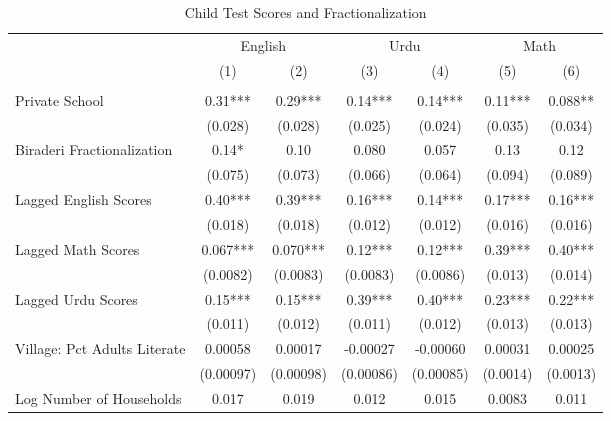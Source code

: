 \begin{sidewaystable}[htbp]\centering
\def\sym#1{\ifmmode^{#1}\else\(^{#1}\)\fi}
\caption{Child Test Scores and Fractionalization \label{kidsnointeract}}
\begin{tabular}{l*{6}{c}}
\toprule
                &\multicolumn{2}{c}{English}&\multicolumn{2}{c}{Urdu} &\multicolumn{2}{c}{Math} \\\cmidrule(lr){2-3}\cmidrule(lr){4-5}\cmidrule(lr){6-7}
                &\multicolumn{1}{c}{(1)}&\multicolumn{1}{c}{(2)}&\multicolumn{1}{c}{(3)}&\multicolumn{1}{c}{(4)}&\multicolumn{1}{c}{(5)}&\multicolumn{1}{c}{(6)}\\
                &\multicolumn{1}{c}{}&\multicolumn{1}{c}{}&\multicolumn{1}{c}{}&\multicolumn{1}{c}{}&\multicolumn{1}{c}{}&\multicolumn{1}{c}{}\\
\midrule
Private School  &     0.31***&     0.29***&     0.14***&     0.14***&     0.11***&    0.088** \\
                &  (0.028)   &  (0.028)   &  (0.025)   &  (0.024)   &  (0.035)   &  (0.034)   \\
Biraderi Fractionalization&     0.14*  &     0.10   &    0.080   &    0.057   &     0.13   &     0.12   \\
                &  (0.075)   &  (0.073)   &  (0.066)   &  (0.064)   &  (0.094)   &  (0.089)   \\
Lagged English Scores&     0.40***&     0.39***&     0.16***&     0.14***&     0.17***&     0.16***\\
                &  (0.018)   &  (0.018)   &  (0.012)   &  (0.012)   &  (0.016)   &  (0.016)   \\
Lagged Math Scores&    0.067***&    0.070***&     0.12***&     0.12***&     0.39***&     0.40***\\
                & (0.0082)   & (0.0083)   & (0.0083)   & (0.0086)   &  (0.013)   &  (0.014)   \\
Lagged Urdu Scores&     0.15***&     0.15***&     0.39***&     0.40***&     0.23***&     0.22***\\
                &  (0.011)   &  (0.012)   &  (0.011)   &  (0.012)   &  (0.013)   &  (0.013)   \\
Village: Pct Adults Literate&  0.00058   &  0.00017   & -0.00027   & -0.00060   &  0.00031   &  0.00025   \\
                &(0.00097)   &(0.00098)   &(0.00086)   &(0.00085)   & (0.0014)   & (0.0013)   \\
Log Number of Households&    0.017   &    0.019   &    0.012   &    0.015   &   0.0083   &    0.011   \\

\end{tabular}
\end{sidewaystable}
